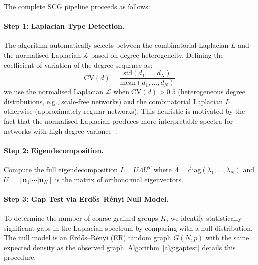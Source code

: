 The complete SCG pipeline proceeds as follows:

\paragraph{Step 1: Laplacian Type Detection.}
The algorithm automatically selects between the combinatorial Laplacian $L$ and the normalised Laplacian $\mathcal{L}$ based on degree heterogeneity. Defining the coefficient of variation of the degree sequence as:
\begin{equation}
    \mathrm{CV}(d) = \frac{\mathrm{std}(d_1, \ldots, d_N)}{\mathrm{mean}(d_1, \ldots, d_N)}
    \label{eq:cv-degree}
\end{equation}
we use the normalised Laplacian $\mathcal{L}$ when $\mathrm{CV}(d) > 0.5$ (heterogeneous degree distributions, e.g., scale-free networks) and the combinatorial Laplacian $L$ otherwise (approximately regular networks). This heuristic is motivated by the fact that the normalised Laplacian produces more interpretable spectra for networks with high degree variance~\cite{luxburg2007tutorial}.

\paragraph{Step 2: Eigendecomposition.}
Compute the full eigendecomposition $L = U \Lambda U^T$ where $\Lambda = \mathrm{diag}(\lambda_1, \ldots, \lambda_N)$ and $U = [\mathbf{u}_1 | \cdots | \mathbf{u}_N]$ is the matrix of orthonormal eigenvectors.

\paragraph{Step 3: Gap Test via Erd\H{o}s--R\'{e}nyi Null Model.}
To determine the number of coarse-grained groups $K$, we identify statistically significant gaps in the Laplacian spectrum by comparing with a null distribution. The null model is an Erd\H{o}s--R\'{e}nyi (ER) random graph $G(N, p)$ with the same expected density as the observed graph. Algorithm~\ref{alg:gaptest} details this procedure.

